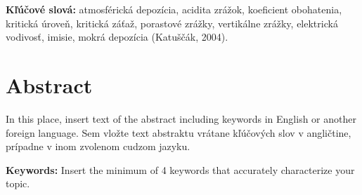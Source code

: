 \vspace{0.5cm}
\textbf{Kľúčové slová:} atmosférická depozícia, acidita zrážok, koeficient obohatenia, kritická úroveň, kritická záťaž, porastové zrážky, vertikálne zrážky, elektrická vodivosť, imisie, mokrá depozícia (Katuščák, 2004). \\

\section*{Abstract}

\hspace{1.25cm}In this place, insert text of the abstract including keywords in English or another foreign language. Sem vložte text abstraktu vrátane kľúčových slov v angličtine, prípadne v inom zvolenom cudzom jazyku. 

\vspace{0.5cm}
\textbf{Keywords:} Insert the minimum of 4 keywords that accurately characterize your topic.
